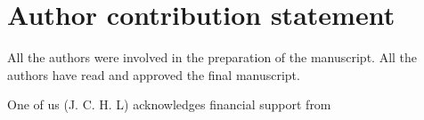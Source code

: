 \section{Author contribution statement}
All the authors were involved in the preparation of the manuscript.
All the authors have read and approved the final manuscript.

One of us (J. C. H. L) acknowledges financial support from 
